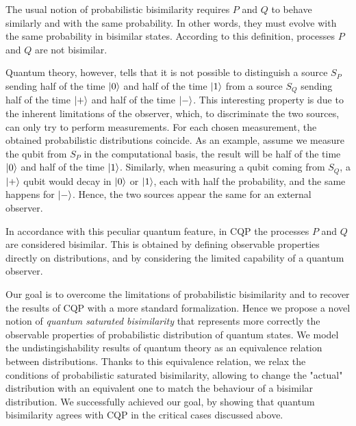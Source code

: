 The usual notion of  probabilistic bisimilarity requires $P$ and $Q$ to behave similarly and with the same probability. In other words, they must evolve with the same probability in bisimilar states. According to this definition, processes $P$ and $Q$ are not bisimilar.

Quantum theory, however, tells that it is not possible to distinguish a source $S_P$ sending half of the time $\ket{0}$ and half of the time $\ket{1}$ from a source $S_Q$ sending half of the time $\ket{+}$ and half of the time $\ket{-}$. This interesting property is due to the inherent limitations of the observer, which, to discriminate the two sources, can only try to perform measurements. For each chosen measurement, the obtained probabilistic distributions coincide. As an example, assume we measure the qubit from $S_P$ in the computational basis, the result will be half of the time $\ket{0}$ and half of the time $\ket{1}$. Similarly, when measuring a qubit coming from $S_Q$, a $\ket{+}$ qubit would decay in $\ket{0}$ or $\ket{1}$, each with half the probability, and the same happens for $\ket{-}$. Hence, the two sources appear the same for an external observer.
 
In accordance with this peculiar quantum feature, in CQP the processes $P$ and $Q$ are considered bisimilar. This is obtained by
defining observable properties directly on distributions, and by considering the limited capability of a quantum observer.

Our goal is to overcome the limitations of probabilistic bisimilarity and to recover the results of CQP with a more standard formalization. Hence we propose a novel notion of \textit{quantum saturated bisimilarity} that represents more correctly the observable properties of probabilistic distribution of quantum states. We model the undistingishability results of quantum theory as an equivalence relation between distributions.  
Thanks to this equivalence relation, we relax the conditions of probabilistic saturated bisimilarity, allowing to change the "actual" distribution with an equivalent one to match the behaviour of a bisimilar distribution.
 We successfully achieved our goal, by showing that quantum bisimilarity agrees with CQP in the critical cases discussed above.
 
